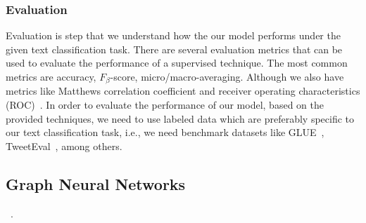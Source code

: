 \subsubsection{Evaluation}
Evaluation is step that we understand how the our model performs under the given text classification task. There are several evaluation metrics that can be used to evaluate the performance of a supervised technique. The most common metrics are accuracy, \(F_\beta \)-score, micro/macro-averaging. Although we also have metrics like Matthews correlation coefficient and receiver operating characteristics (ROC)~\autocite{li20tc,minaee20tc}. In order to evaluate the performance of our model, based on the provided techniques, we need to use labeled data which are preferably specific to our text classification task, i.e., we need benchmark datasets like GLUE~\autocite{wang18glue}, TweetEval~\autocite{tweeteval}, among others.

\subsection{Graph Neural Networks}\label{sec:GNN}
~\autocite{zhou20gnn,wu21gnn,zhang18dlongraphs,sun18adversarial}.